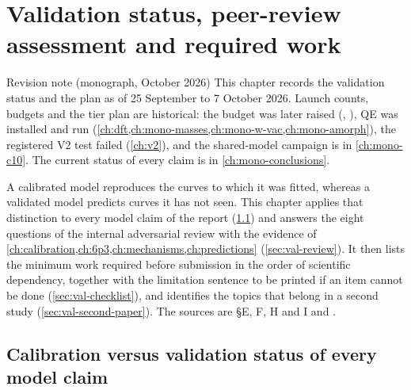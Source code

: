 \chapter{Validation status, peer-review assessment and required work}\label{ch:validation}

\begin{statusbox}{Revision note (monograph, October 2026)}
This chapter records the validation status and the plan as of 25 September to 7 October 2026. Launch
counts, budgets and the tier plan are historical: the budget was later raised (, ), QE
was installed and run (\cref{ch:dft,ch:mono-masses,ch:mono-w-vac,ch:mono-amorph}), the registered V2 test
failed (\cref{ch:v2}), and the shared-model campaign is in \cref{ch:mono-c10}. The current status of every
claim is in \cref{ch:mono-conclusions}.
\end{statusbox}

A calibrated model reproduces the curves to which it was fitted, whereas a validated model predicts curves it has not seen. This chapter applies that distinction to every model claim of the report (\cref{sec:val-status}) and answers the eight questions of the internal adversarial review with the evidence of \cref{ch:calibration,ch:6p3,ch:mechanisms,ch:predictions} (\cref{sec:val-review}). It then lists the minimum work required before submission in the order of scientific dependency, together with the limitation sentence to be printed if an item cannot be done (\cref{sec:val-checklist}), and identifies the topics that belong in a second study (\cref{sec:val-second-paper}). The sources are  \S E, F, H and I and .

\section{Calibration versus validation status of every model claim}\label{sec:val-status}

